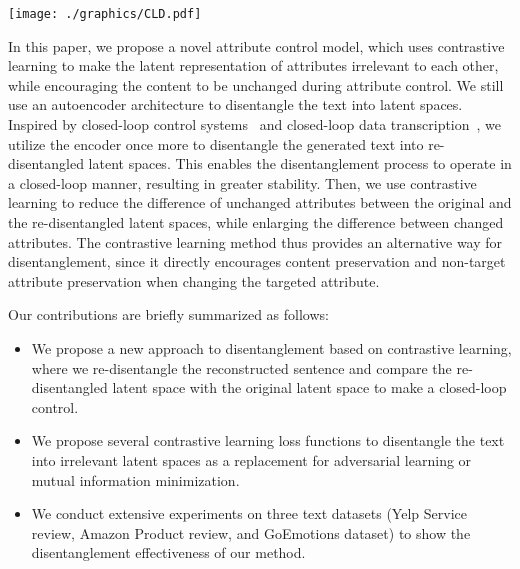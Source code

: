 \documentclass[11pt,a4paper]{article}
\newcommand{\Mname}{CLD}
\renewcommand{\cite}{\citep}
\begin{document}
\begin{figure*}
    \centering
    \texttt{[image: ./graphics/CLD.pdf]}
    \caption{Complete architecture of our proposed model \Mname. The upper row (a) represents the normal disentanglement process. The lower row (b) imitates the style/attribute transfer process. In both  processes, we conduct re-disentanglement and use contrastive learning  to encourage the content vector ($c$) to stay unchanged, while the style vectors ($s$, $\tilde s$) change to the desired values. }
    \label{fig:arch}
\end{figure*}

In this paper, we propose   a novel attribute control model, which uses contrastive learning to make the   latent representation of attributes irrelevant to each other, while encouraging the content to be unchanged during attribute control.
We still use an autoencoder architecture to disentangle the text into  latent spaces. Inspired by closed-loop control systems~\cite{di1967feedback} and closed-loop data transcription~\cite{dai2021closed}, we utilize the encoder once more to disentangle the generated text into re-disentangled latent spaces. This enables the disentanglement process to operate in a closed-loop manner, resulting in greater stability. Then, we use contrastive learning to reduce the difference of unchanged attributes between the original and the re-disentangled latent spaces, while enlarging the difference between changed attributes. %
The contrastive learning method thus  provides an alternative way for disentanglement, since it directly encourages content preservation and non-target attribute preservation when changing the targeted attribute.


Our contributions are briefly summarized as follows:
\begin{itemize}%
    \item We propose a new approach to disentanglement based on contrastive learning, where we re-disentangle the reconstructed sentence and compare the re-disentangled latent space with the original latent space to make a closed-loop control. 
    
    
    \item We propose several contrastive learning loss functions  to   disentangle the text into irrelevant latent spaces as a   replacement for adversarial learning or mutual information minimization.
    \item We conduct extensive experiments on three text datasets (Yelp Service review, Amazon Product review, and GoEmotions dataset) to show the disentanglement effectiveness of our method.
\end{itemize}
\end{document}
